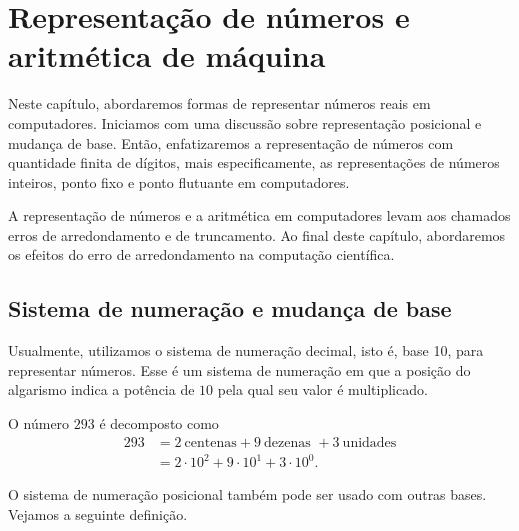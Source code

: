 %

\chapter{Representação de números e aritmética de máquina}

Neste capítulo, abordaremos formas de representar números reais em computadores. Iniciamos com uma discussão sobre representação posicional e mudança de base. Então, enfatizaremos a representação de números com quantidade finita de dígitos, mais especificamente, as representações de números inteiros, ponto fixo e ponto flutuante em computadores.

A representação de números e a aritmética em computadores levam aos chamados erros de arredondamento e de truncamento. Ao final deste capítulo, abordaremos os efeitos do erro de arredondamento na computação científica.

\section{Sistema de numeração e mudança de base}
Usualmente, utilizamos o sistema de numeração decimal, isto é, base 10, para representar números. Esse é um sistema de numeração em que a posição do algarismo indica a potência de $10$ pela qual seu valor é multiplicado.

\begin{ex}
  O número $293$ é decomposto como
  \begin{equation}
    \begin{split}
      293 &= 2\ \text{centenas} + 9\ \text{dezenas }+ 3\ \text{unidades}\\
      &= 2\cdot 10^2+9\cdot 10^1+3\cdot 10^0.
    \end{split}
  \end{equation}
\end{ex}

O sistema de numeração posicional também pode ser usado com outras bases. Vejamos a seguinte definição.


